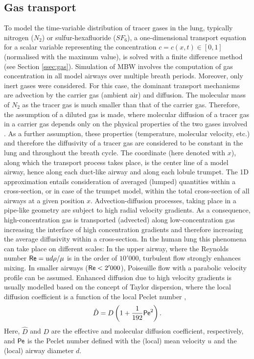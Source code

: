 \subsection{Gas transport} \label{ssec:lobules}
To model the time-variable distribution of tracer gases in the lung, typically nitrogen ($N_2$) or sulfur-hexafluoride ($SF_6$), a one-dimensional transport equation for a scalar variable representing the concentration $c = c(x,t)\in[0,1]$ (normalised with the maximum value), is solved with a finite difference method (see Section \ref{ssec:gas}).
Simulation of MBW involves the computation of gas concentration in all model airways over multiple breath periods.
Moreover, only inert gases were considered.
For this case, the dominant transport mechanisms are advection by the carrier gas (ambient air) and diffusion.
The molecular mass of $N_2$ as the tracer gas is much smaller than that of the carrier gas.
Therefore, the assumption of a diluted gas is made, where molecular diffusion of a tracer gas in a carrier gas depends only on the physical properties of the two gases involved \cite{Cussler2009}.
As a further assumption, these properties (temperature, molecular velocity, etc.) and therefore the diffusivity of a tracer gas are considered to be constant in the lung and throughout the breath cycle.
The coordinate (here denoted with $x$), along which the transport process takes place, is the center line of a model airway, hence along each duct-like airway and along each lobule trumpet.
The 1D approximation entails consideration of averaged (lumped) quantities within a cross-section, or in case of the trumpet model, within the total cross-section of all airways at a given position $x$.
Advection-diffusion processes, taking place in a pipe-like geometry are subject to high radial velocity gradients.
As a consequence, high-concentration gas is transported (advected) along low-concentration gas increasing the interface of high concentration gradients and therefore increasing the average diffusivity within a cross-section.
In the human lung this phenomena can take place on different scales: In the upper airway, where the Reynolds number $\mathsf{Re} = u d \rho/\mu$ is in the order of $10'000$, turbulent flow strongly enhances mixing.
In smaller airways ($\mathsf{Re} < 2'000$), Poiseuille flow with a parabolic velocity profile can be assumed.
Enhanced diffusion due to high velocity gradients is usually modelled based on the concept of Taylor dispersion, where the local diffusion coefficient is a function of the local Peclet number \citet{Cussler2009},
\begin{equation}
\hat{D} = D\left(1 + \frac{1}{192}\mathsf{Pe}^2\right) \text{.}
\end{equation}
Here, $\hat{D}$ and $D$ are the effective and molecular diffusion coefficient, respectively, and $\mathsf{Pe}$ is the Peclet number defined with the (local) mean velocity $u$ and the (local) airway diameter $d$.

